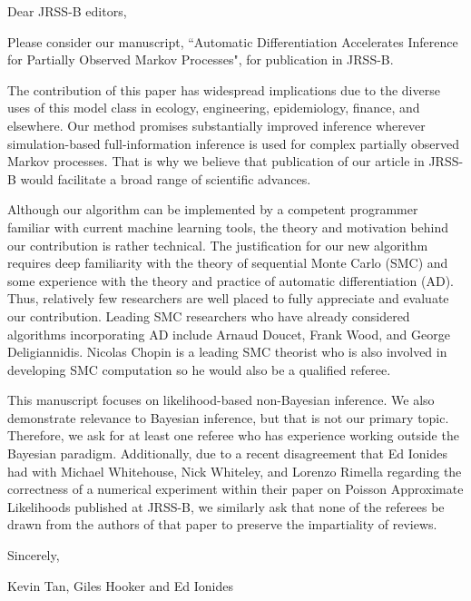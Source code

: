 \documentclass[11pt]{article}
\begin{document}
\noindent Dear JRSS-B editors,
\newline

Please consider our manuscript, ``Automatic Differentiation Accelerates Inference for Partially Observed Markov Processes", for publication in JRSS-B.

The contribution of this paper has widespread implications due to the diverse uses of this model class in ecology, engineering, epidemiology, finance, and elsewhere. Our method promises substantially improved inference wherever simulation-based full-information inference is used for complex partially observed Markov processes. That is why we believe that publication of our article in JRSS-B would facilitate a broad range of scientific advances. 

Although our algorithm can be implemented by a competent programmer familiar with current machine learning tools, the theory and motivation behind our contribution is rather technical. The justification for our new algorithm requires deep familiarity with the theory of sequential Monte Carlo (SMC) and some experience with the theory and practice of automatic differentiation (AD). Thus, relatively few researchers are well placed to fully appreciate and evaluate our contribution. Leading SMC researchers who have already considered algorithms incorporating AD include Arnaud Doucet, Frank Wood, and George Deligiannidis. Nicolas Chopin is a leading SMC theorist who is also involved in developing SMC computation so he would also be a qualified referee. 

This manuscript focuses on likelihood-based non-Bayesian inference. We also demonstrate relevance to Bayesian inference, but that is not our primary topic. Therefore, we ask for at least one referee who has experience working outside the Bayesian paradigm. Additionally, due to a recent disagreement that Ed Ionides had with Michael Whitehouse, Nick Whiteley, and Lorenzo Rimella regarding the correctness of a numerical experiment within their paper on Poisson Approximate Likelihoods published at JRSS-B, we similarly ask that none of the referees be drawn from the authors of that paper to preserve the impartiality of reviews.
\vspace{3ex}

\noindent Sincerely,

\noindent Kevin Tan, Giles Hooker and Ed Ionides
\end{document}
